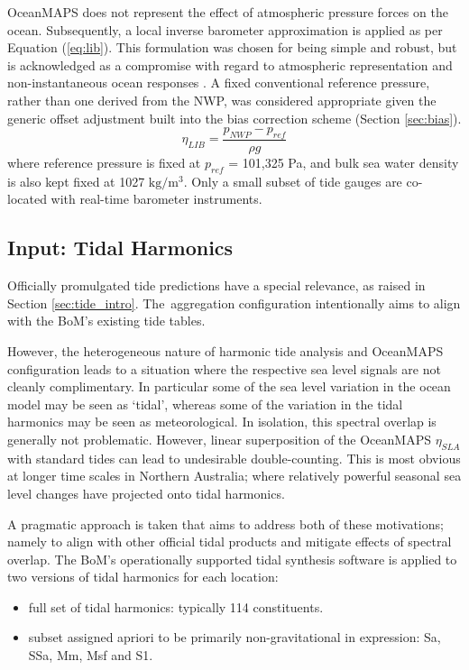 OceanMAPS does not represent the effect of atmospheric pressure forces on the ocean.
Subsequently, a local inverse barometer approximation is applied as per Equation (\ref{eq:lib}).
This formulation was chosen for being simple and robust, but is acknowledged as a compromise with regard to atmospheric representation and non-instantaneous ocean responses \cite{Mathers:2004bk}.
A fixed conventional reference pressure, rather than one derived from the NWP, was considered appropriate given the generic offset adjustment built into the bias correction scheme (Section \ref{sec:bias}).  
\begin{equation}
  \eta_{LIB} = \frac{ p_{NWP} - p_{ref} }{ \rho g }
  \label{eq:lib}
\end{equation}
where reference pressure is fixed at $p_{ref}$ = 101,325 Pa, and bulk sea water density is also kept fixed at 1027 $\text{kg}/\text{m}^3$.
Only a small subset of tide gauges are co-located with real-time barometer instruments.


\subsection{Input: Tidal Harmonics }
\label{sec:harmonics}
Officially promulgated tide predictions have a special relevance, as raised in Section \ref{sec:tide_intro}.
The~aggregation configuration intentionally aims to align with the BoM's existing tide tables. 

However, the heterogeneous nature of harmonic tide analysis and OceanMAPS configuration leads to a situation where the respective sea level signals are not cleanly complimentary.
In particular some of the sea level variation in the ocean model may be seen as `tidal', whereas some of the variation in the tidal harmonics may be seen as meteorological.   
In isolation, this spectral overlap is generally not problematic. 
However, linear superposition of the OceanMAPS $\eta_{SLA}$ with standard tides can lead to undesirable double-counting. 
This is most obvious at longer time scales in Northern Australia; where relatively powerful seasonal sea level changes have projected onto tidal harmonics.


A pragmatic approach is taken that aims to address both of these motivations; namely to align with other official tidal products and mitigate effects of spectral overlap.
The BoM's operationally supported tidal synthesis software is applied to two versions of tidal harmonics for each location:
\begin{itemize}[leftmargin=*]%
  \item full set of tidal harmonics: typically 114 constituents.
  \item subset assigned apriori to be primarily non-gravitational in expression: Sa, SSa, Mm, Msf and S1.
\end{itemize}

